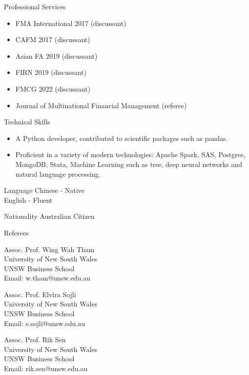 \documentclass{resume} %
\begin{document}
\begin{rSection}{Professional Services}
	\begin{itemize}
		\item FMA International 2017 (discussant)
		\item CAFM 2017 (discussant)
		\item Asian FA 2019 (discussant)
		\item FIRN 2019 (discussant)
		\item FMCG 2022 (discussant)
    \item Journal of Multinational Financial Management (referee)
	\end{itemize}
\end{rSection}

\begin{rSection}{Technical Skills}
	\begin{itemize}
		\item A Python developer, contributed to scientific packages such as pandas.
		\item Proficient in a variety of modern technologies: Apache Spark, SAS, Postgres, MongoDB, Stata, Machine Learning such as tree, deep neural networks and natural language processing.
	\end{itemize}
\end{rSection}

\begin{rSection}{Language}
	Chinese - Native\\
	English - Fluent
\end{rSection}

\begin{rSection}{Nationality}
	Australian Citizen
\end{rSection}

\begin{rSection}{Referees} \itemsep -3pt
	\begin{multicols}{2}
		Assoc. Prof. Wing Wah Tham\\
		University of New South Wales\\
		UNSW Business School\\
		Email: w.tham@unsw.edu.au

		Assoc. Prof. Elvira Sojli\\
		University of New South Wales\\
		UNSW Business School\\
		Email: e.sojli@unsw.edu.au\\
		\columnbreak

		Assoc. Prof. Rik Sen\\
		University of New South Wales\\
		UNSW Business School\\
		Email: rik.sen@unsw.edu.au
	\end{multicols}

\end{rSection}
\end{document}

